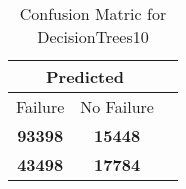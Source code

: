 \begin{table}[] 
\caption{Confusion Matric for DecisionTrees10} 
\label{Table: Prediction Accuracy-NoneDecisionTrees10OnlySunEKF-ignoreReflection-Reflection} 
\centering 
\begin{tabular} 
 {@{}ccc@{}} 
\toprule 
\multicolumn{2}{c}{\textbf{Predicted}}
 \\ \midrule 
\multicolumn{1}{|c|}{Failure} & 
\multicolumn{1}{c|}{No Failure}
 \\ \midrule 
\multicolumn{1}{|c|}{\color{green}\textbf{93398}} & 
\multicolumn{1}{c|}{\color{red}\textbf{15448}}
 \\ \midrule 
\multicolumn{1}{|c|}{\color{red}\textbf{43498}} & 
\multicolumn{1}{c|}{\color{green}\textbf{17784}}
 \\ \bottomrule 
\end{tabular} 
\end{table} 
